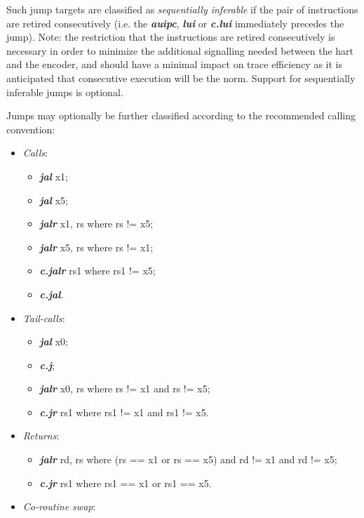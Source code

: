 Such jump targets are classified as \textit{sequentially inferable} if the pair of instructions are retired consecutively 
(i.e. the \textbf{\textit{auipc}}, \textbf{\textit{lui}} or \textbf{\textit{c.lui}} immediately precedes the jump).  Note:
the restriction that the instructions are retired consecutively is necessary in order to minimize the additional signalling
needed between the hart and the encoder, and should have a minimal impact on trace efficiency as it is anticipated that
consecutive execution will be the norm. Support for sequentially inferable jumps is optional.

Jumps may optionally be further classified according to the recommended calling convention:

\begin{itemize}
  \item \textit{Calls}: 
    \begin{itemize}
      \item \textbf{\textit{jal}} x1;
      \item \textbf{\textit{jal}} x5;
      \item \textbf{\textit{jalr}} x1, rs  where rs != x5;
      \item \textbf{\textit{jalr}} x5, rs  where rs != x1;
      \item \textbf{\textit{c.jalr}} rs1 where rs1 != x5;
      \item \textbf{\textit{c.jal}}.
    \end{itemize}
  \item \textit{Tail-calls}: 
    \begin{itemize}
      \item \textbf{\textit{jal}} x0;
      \item \textbf{\textit{c.j}};
      \item \textbf{\textit{jalr}} x0, rs where rs != x1 and rs != x5;
      \item \textbf{\textit{c.jr}} rs1 where rs1 != x1 and rs1 != x5.
    \end{itemize}
  \item \textit{Returns}: 
    \begin{itemize}
      \item \textbf{\textit{jalr}} rd, rs where (rs == x1 or rs == x5) and rd != x1 and rd != x5;
      \item \textbf{\textit{c.jr}} rs1 where rs1 == x1 or rs1 == x5.
    \end{itemize}
  \item \textit{Co-routine swap}: 
    \begin{itemize}

\end{itemize}
\end{itemize}
